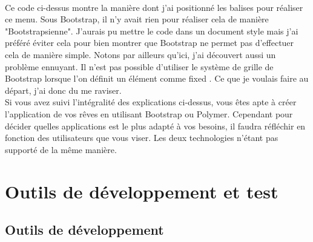 \documentclass{article}
\begin{document}
\vspace{0.5cm}\\
Ce code ci-dessus montre la mani\`ere dont j'ai positionn\'e les balises pour r\'ealiser ce menu. Sous Bootstrap, il n'y avait rien pour r\'ealiser cela de mani\`ere "Bootstrapsienne". J'aurais pu mettre le code dans un document style mais j'ai pr\'ef\'er\'e \'eviter cela pour bien montrer que Bootstrap ne permet pas d'effectuer cela de mani\`ere simple. Notons par ailleurs qu'ici, j'ai d\'ecouvert aussi un probl\`eme ennuyant. Il n'est pas possible d'utiliser le syst\`eme de grille de Bootstrap lorsque l'on d\'efinit un \'el\'ement comme \og fixed \fg{}. Ce que je voulais faire au d\'epart, j'ai donc du me raviser.
\vspace{0.5cm}\\
Si vous avez suivi l'int\'egralit\'e des explications ci-dessus, vous \^etes apte \`a cr\'eer l'application de vos r\^eves en utilisant Bootstrap ou Polymer. Cependant pour d\'ecider quelles applications est le plus adapt\'e \`a vos besoins, il faudra r\'efl\'echir en fonction des utilisateurs que vous viser. Les deux technologies n'\'etant pas support\'e de la m\^eme mani\`ere.
 
\newpage
\section{Outils de d\'eveloppement et test}

\subsection{Outils de d\'eveloppement}
\end{document}
